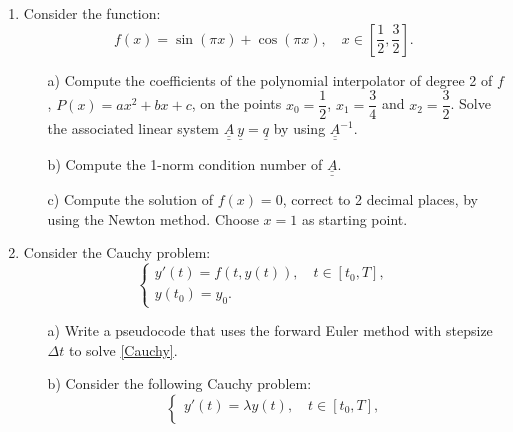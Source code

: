 \documentclass{article}
\newcommand{\GS}[1]{{\color{red} GS: #1}}
\begin{document}


\begin{enumerate}
\item
Consider the function:
\begin{equation}
f(x) = \sin(\pi x) + \cos(\pi x), \quad x \in \left[\dfrac{1}{2}, \dfrac{3}{2}\right].
\end{equation}
\begin{itemize}
\item[a)] Compute the coefficients of the polynomial interpolator of degree 2 of $f$, $P(x) = ax^2 + bx + c$, on the points $x_0 = \dfrac{1}{2}$, $x_1 = \dfrac{3}{4}$ and $x_2 = \dfrac{3}{2}$. Solve the associated linear system $\underline{\underline{A}}~\underline{y} = \underline{q}$ by using $\underline{\underline{A}}^{-1}$.
\item[b)] Compute the 1-norm condition number of $\underline{\underline{A}}$. %
\item[c)] Compute the solution of $f(x) = 0$, correct to 2 decimal places, by using the Newton method. Choose $x = 1$ as starting point. %
\end{itemize}
\item
Consider the Cauchy problem:
\begin{equation}\label{Cauchy}
\begin{cases}
y'(t) = f(t,y(t)), \quad t \in [t_0, T], \\
y(t_0) = y_0.
\end{cases}
\end{equation}
\begin{itemize}
\item[a)] Write a pseudocode that uses the forward Euler method with stepsize $\Delta t$ to solve \eqref{Cauchy}. %
\item[b)] Consider the following Cauchy problem:%
\begin{equation}\label{Cauchy2}
\begin{cases}
y'(t) = \lambda y(t), \quad t \in [t_0, T], \\

\end{cases}
\end{equation}
\end{itemize}
\end{enumerate}
\end{document}
